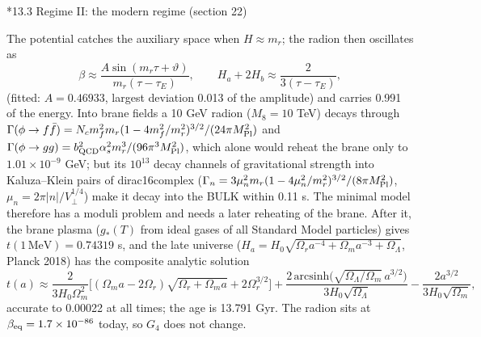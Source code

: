 \documentclass[10pt,a4paper]{article}
\makeatletter
\renewcommand\subsection{\@startsection{subsection}{2}{\z@}{-3.25ex\@plus -1ex \@minus -.2ex}{1.5ex \@plus .2ex}{\normalfont\large\bfseries\raggedright}}
\makeatother
\begin{document}
\subsection*{13.3 Regime II: the modern regime (section 22)}
The potential catches the auxiliary space when $H\approx m_r$; the radion then oscillates as
\begin{equation*}
\beta\approx\frac{A\sin(m_r\tau+\vartheta)}{m_r(\tau-\tau_E)},\qquad H_a+2H_b\approx\frac2{3(\tau-\tau_E)},
\end{equation*}
(fitted: $A=0.46933$, largest deviation 0.013 of the amplitude) and carries 0.991 of the energy. Into brane fields a 10 GeV radion ($M_8=10$ TeV) decays through $\Gamma(\phi\to f\bar f)=N_cm_f^2m_r(1-4m_f^2/m_r^2)^{3/2}/(24\pi M_{\rm Pl}^2)$ and $\Gamma(\phi\to gg)=b_{\rm QCD}^2\alpha_s^2m_r^3/(96\pi^3M_{\rm Pl}^2)$, which alone would reheat the brane only to $1.01\times10^{-9}$ GeV; but its $10^{13}$ decay channels of gravitational strength into Kaluza–Klein pairs of dirac16complex ($\Gamma_n=3\mu_n^2m_r(1-4\mu_n^2/m_r^2)^{3/2}/(8\pi M_{\rm Pl}^2)$, $\mu_n=2\pi|n|/V_\perp^{1/4}$) make it decay into the BULK within 0.11 s. The minimal model therefore has a moduli problem and needs a later reheating of the brane. After it, the brane plasma ($g_*(T)$ from ideal gases of all Standard Model particles) gives $t(1\,\mathrm{MeV})=0.74319$ s, and the late universe ($H_a=H_0\sqrt{\Omega_ra^{-4}+\Omega_ma^{-3}+\Omega_\Lambda}$, Planck 2018) has the composite analytic solution
\begin{equation*}
t(a)\approx\frac{2}{3H_0\Omega_m^2}\Big[(\Omega_ma-2\Omega_r)\sqrt{\Omega_r+\Omega_ma}+2\Omega_r^{3/2}\Big]+\frac{2\,\mathrm{arcsinh}\big(\sqrt{\Omega_\Lambda/\Omega_m}\,a^{3/2}\big)}{3H_0\sqrt{\Omega_\Lambda}}-\frac{2a^{3/2}}{3H_0\sqrt{\Omega_m}},
\end{equation*}
accurate to 0.00022 at all times; the age is 13.791 Gyr. The radion sits at $\beta_{\rm eq}=1.7\times10^{-86}$ today, so $G_4$ does not change.
\end{document}
